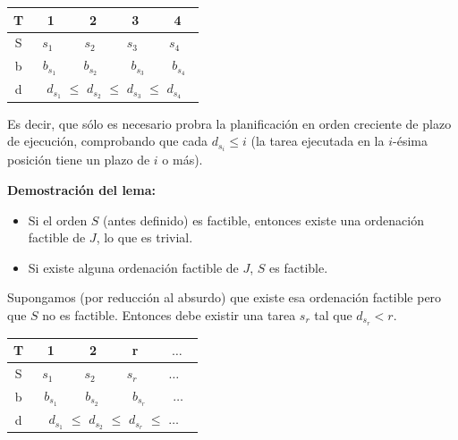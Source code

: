 \documentclass[10pt,a4paper,spanish]{report}
\theoremstyle{definition}
\theoremstyle{remark}
\begin{document}
\begin{center}
    \begin{tabular}{|c|c|c|c|c|}
        \hline
        \rowcolor[rgb]{0.8,0.8,0.8}T & 1 & 2 & 3 & 4 \\
        \hline
        \cellcolor[rgb]{0.8,0.8,0.8}S & ~$s_1$~~ & ~$s_2$~~ & ~$s_3$~~& ~$s_4$~~\\
        \hline
        \cellcolor[rgb]{0.9,0.9,0.9}b & \multicolumn{4}{c|}{$b_{s_1}$ ~~~ $b_{s_2}$ ~~~~ $b_{s_3}$ ~~~ $b_{s_4}$}\\
        \hline
        \cellcolor[rgb]{0.9,0.9,0.9}d & \multicolumn{4}{c|}{$d_{s_1}$ $\leq$ $d_{s_2}$ $\leq$ $d_{s_3}$ $\leq$ $d_{s_4}$}\\
        \hline
    \end{tabular}
\end{center}

Es decir, que sólo es necesario probra la planificación en orden creciente de plazo de ejecución, comprobando que cada $d_{s_i} \leq i$ (la tarea ejecutada en la $i$-ésima posición tiene un plazo de $i$ o más).

\textbf{Demostración del lema:}

\begin{itemize}
    \item Si el orden $S$ (antes definido) es factible, entonces existe una ordenación factible de $J$, lo que es trivial.
    \item Si existe alguna ordenación factible de $J$, $S$ es factible.
\end{itemize}

Supongamos (por reducción al absurdo) que existe esa ordenación factible pero que $S$ no es factible. Entonces debe existir una tarea $s_r$ tal que $d_{s_r} < r$.

\begin{center}
    \begin{tabular}{|c|c|c|c|c|}
        \hline
        \rowcolor[rgb]{0.8,0.8,0.8}T & 1 & 2 & r & $\ldots$ \\
        \hline
        \cellcolor[rgb]{0.8,0.8,0.8}S & ~$s_1$~~ & ~$s_2$~~ & ~$s_r$~~& ~$\ldots$~~\\
        \hline
        \cellcolor[rgb]{0.9,0.9,0.9}b & \multicolumn{4}{c|}{$b_{s_1}$ ~~~ $b_{s_2}$ ~~~~ $b_{s_r}$ ~~~ $\ldots$}\\
        \hline
        \cellcolor[rgb]{0.9,0.9,0.9}d & \multicolumn{4}{c|}{$d_{s_1}$ $\leq$ $d_{s_2}$ $\leq$ $d_{s_r}$ $\leq$ $\ldots$}\\
        \hline
    \end{tabular}
\end{center}
\end{document}

